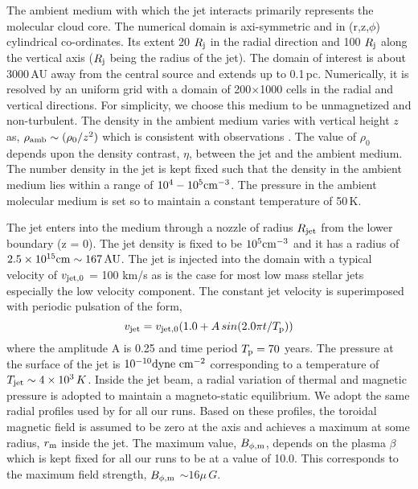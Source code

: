 \documentclass[useAMS,usenatbib]{mn2e}
\begin{document}
The ambient medium with which the jet interacts primarily
represents the molecular cloud core. The numerical domain is axi-symmetric
and in (r,z,$\phi$) cylindrical co-ordinates. Its extent 20 $R_{\rm j}$ in the radial
direction and 100
$R_{\rm j}$ along the vertical axis ($R_{\rm j}$ being the radius of
the jet). The domain of interest is about 3000\,AU away from the
central source and extends up to 0.1\,pc. Numerically, it is resolved by an uniform grid with a domain of 200$\times$1000 cells in the radial and vertical directions. For simplicity, we choose this medium
to be unmagnetized and non-turbulent. The density in the ambient
medium varies with vertical height $z$ as, $\rho_{\rm amb}\sim (\rho_0/z^{2})$
which is consistent with observations \citep{Caselli:2011p13935}. The value of
$\rho_0$ depends upon the density contrast, $\eta$, between the jet and
the ambient medium. The number density in the jet is kept fixed such
that the density in the ambient medium lies within a range of $10^{4}-10^{5}
\rm cm^{-3}$. The pressure in the ambient molecular medium is
set so to maintain a constant temperature of 50\,K. 
%

The jet enters into the medium through a nozzle of radius $R_{\rm jet}$
from the lower boundary (z = 0). The jet density is fixed to
be $10^{5} \rm cm^{-3}$ and it has a radius of $2.5\times10^{15} \rm cm \sim
167\,AU$. The jet is injected into the domain with a typical 
velocity of $v_{\rm jet,0}$ = 100 km/s as is the case for most low mass stellar jets
especially the low velocity component. The constant jet velocity is
superimposed with periodic pulsation of the form,
\begin{equation}
v_{\rm jet} = v_{\rm jet,0}(1.0 + A\,sin(2.0\pi t/T_{\rm p}))
\end{equation}
where the amplitude A is 0.25 and time period $T_{\rm p} = 70$
years. The pressure at the surface of the jet is $10^{-10} \rm
dyne\,\,cm^{-2}$ corresponding to a temperature of $T_{\rm jet} \sim
4\times10^{3}\,K$. Inside the jet beam, a radial variation of thermal
and magnetic pressure is adopted to maintain a magneto-static
equilibrium. We adopt the
same radial profiles used by \cite{Stone:2000p2650} for all our runs. 
Based on these profiles, the toroidal magnetic field is assumed to be
zero at the axis and achieves a maximum at some radius, $r_{\rm m}$
inside the jet. The maximum value, $B_{\phi,\rm m}$, depends on the
plasma $\beta$ which is kept fixed for all our runs to be at a value
of 10.0. This corresponds to the maximum field strength, $B_{\phi,\rm m}$ $\sim
16\mu\,G$. 
\end{document}
